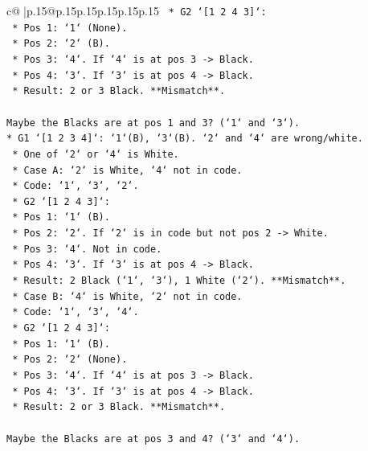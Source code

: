 \documentclass{article}
\begin{document}
{\begin{supertabular}{c@{$\;$}|p{.15\linewidth}@{}p{.15\linewidth}p{.15\linewidth}p{.15\linewidth}p{.15\linewidth}p{.15\linewidth}}
{{{\texttt{        *   G2 `{[}1 2 4 3{]}`:} \\
\texttt{            *   Pos 1: `1` (None).} \\
\texttt{            *   Pos 2: `2` (B).} \\
\texttt{            *   Pos 3: `4`. If `4` is at pos 3 {-}> Black.} \\
\texttt{            *   Pos 4: `3`. If `3` is at pos 4 {-}> Black.} \\
\texttt{            *   Result: 2 or 3 Black. **Mismatch**.} \\
\\ 
\texttt{Maybe the Blacks are at pos 1 and 3? (`1` and `3`).} \\
\texttt{*   G1 `{[}1 2 3 4{]}`: `1`(B), `3`(B). `2` and `4` are wrong/white.} \\
\texttt{    *   One of `2` or `4` is White.} \\
\texttt{    *   Case A: `2` is White, `4` not in code.} \\
\texttt{        *   Code: `1`, `3`, `2`.} \\
\texttt{        *   G2 `{[}1 2 4 3{]}`:} \\
\texttt{            *   Pos 1: `1` (B).} \\
\texttt{            *   Pos 2: `2`. If `2` is in code but not pos 2 {-}> White.} \\
\texttt{            *   Pos 3: `4`. Not in code.} \\
\texttt{            *   Pos 4: `3`. If `3` is at pos 4 {-}> Black.} \\
\texttt{            *   Result: 2 Black (`1`, `3`), 1 White (`2`). **Mismatch**.} \\
\texttt{    *   Case B: `4` is White, `2` not in code.} \\
\texttt{        *   Code: `1`, `3`, `4`.} \\
\texttt{        *   G2 `{[}1 2 4 3{]}`:} \\
\texttt{            *   Pos 1: `1` (B).} \\
\texttt{            *   Pos 2: `2` (None).} \\
\texttt{            *   Pos 3: `4`. If `4` is at pos 3 {-}> Black.} \\
\texttt{            *   Pos 4: `3`. If `3` is at pos 4 {-}> Black.} \\
\texttt{            *   Result: 2 or 3 Black. **Mismatch**.} \\
\\ 
\texttt{Maybe the Blacks are at pos 3 and 4? (`3` and `4`).} \\
}}}
\end{supertabular}}
\end{document}
